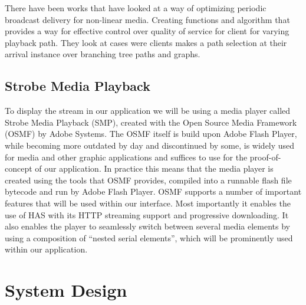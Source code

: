 \documentclass[9pt,a4paper]{acmproc}
\begin{document}
There have been works that have looked at a way of optimizing periodic broadcast delivery for non-linear media. Creating functions and algorithm that provides a way for effective control over quality of service for client for varying playback path. They look at cases were clients makes a path selection at their arrival instance over branching tree paths and graphs.\cite{optimizedbroadcast}



\subsection{Strobe Media Playback}

To display the stream in our application we will be using a media player called Strobe Media Playback (SMP), created with the Open Source Media Framework (OSMF) by Adobe Systems. The OSMF itself is build upon Adobe Flash Player, while becoming more outdated by day and discontinued by some, is widely used for media and other graphic applications and suffices to use for the proof-of-concept of our application. In practice this means that the media player is created using the tools that OSMF provides, compiled into a runnable flash file bytecode and run by Adobe Flash Player. 
OSMF supports a number of important features that will be used within our interface. Most importantly it enables the use of HAS with its HTTP streaming support and progressive downloading. It also enables the player to seamlessly switch between several media elements by using a composition of “nested serial elements”, which will be prominently used within our application.\cite{osmf}

\section{System Design}
\end{document}
